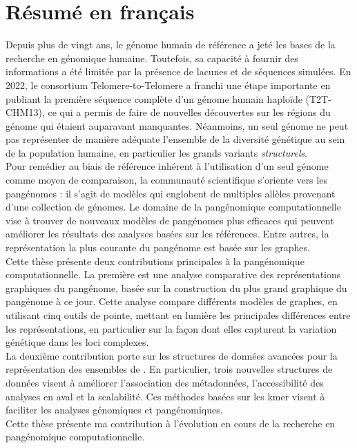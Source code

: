 \section{Résumé en français}
Depuis plus de vingt ans, le génome humain de référence a jeté les bases de la recherche en génomique humaine. Toutefois, sa capacité à fournir des informations a été limitée par la présence de lacunes et de séquences simulées. En 2022, le consortium Telomere-to-Telomere a franchi une étape importante en publiant la première séquence complète d'un génome humain haploïde (T2T-CHM13), ce qui a permis de faire de nouvelles découvertes sur les régions du génome qui étaient auparavant manquantes. Néanmoins, un seul génome ne peut pas représenter de manière adéquate l'ensemble de la diversité génétique au sein de la population humaine, en particulier les grands variants \emph{structurels}.\\
Pour remédier au biais de référence inhérent à l'utilisation d'un seul génome comme moyen de comparaison, la communauté scientifique s'oriente vers les pangénomes : il s'agit de modèles qui englobent de multiples allèles provenant d'une collection de génomes. Le domaine de la pangénomique computationnelle vise à trouver de nouveaux modèles de pangénomes plus efficaces qui peuvent améliorer les résultats des analyses basées sur les références. Entre autres, la représentation la plus courante du pangénome est basée sur les graphes.\\
Cette thèse présente deux contributions principales à la pangénomique computationnelle. La première est une analyse comparative des représentations graphiques du pangénome, basée sur la construction du plus grand graphique du pangénome à ce jour. Cette analyse compare différents modèles de graphes, en utilisant cinq outils de pointe, mettant en lumière les principales différences entre les représentations, en particulier sur la façon dont elles capturent la variation génétique dans les loci complexes.\\
La deuxième contribution porte sur les structures de données avancées pour la représentation des ensembles de \kmer. En particulier, trois nouvelles structures de données visent à améliorer l'association des métadonnées, l'accessibilité des analyses en aval et la scalabilité. Ces méthodes basées sur les kmer visent à faciliter les analyses génomiques et pangénomiques.\\
Cette thèse présente ma contribution à l'évolution en cours de la recherche en pangénomique computationnelle.